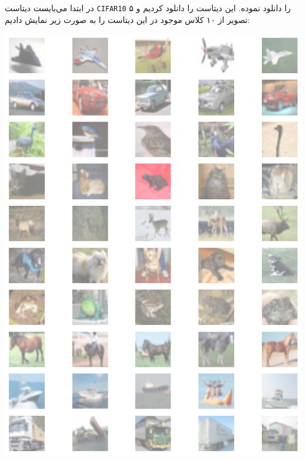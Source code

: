 \begin{qsolve}
در ابتدا می‌بایست دیتاست \texttt{CIFAR10} را دانلود نموده. این دیتاست را دانلود کردیم و ۵ تصویر از ۱۰ کلاس موجود در این دیتاست را به صورت زیر نمایش دادیم:
\end{qsolve}

\begin{qsolve}
	\begin{center}
		\includegraphics*[width=1\linewidth]{pics/img3.png}
		\label{تصاویری رندوم از دیتاست CIFAR10}
	\end{center}
\end{qsolve}

